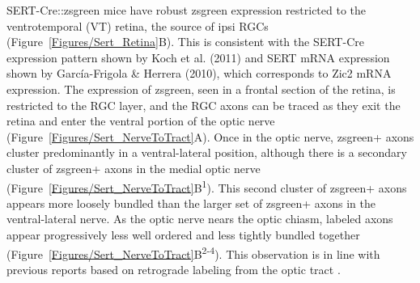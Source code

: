 SERT-Cre::zsgreen mice have robust zsgreen expression restricted to the ventrotemporal (VT) retina, the source of ipsi RGCs (Figure~\ref{Figures/Sert_Retina}B).
This is consistent with the SERT-Cre expression pattern shown by Koch et al. (2011) and SERT mRNA expression shown by Garc\'ia-Frigola \& Herrera (2010), which corresponds to Zic2 mRNA expression. 
The expression of zsgreen, seen in a frontal section of the retina, is restricted to the RGC layer, and the RGC axons can be traced as they exit the retina and enter the ventral portion of the optic nerve (Figure~\ref{Figures/Sert_NerveToTract}A).
Once in the optic nerve, zsgreen+ axons cluster predominantly in a ventral-lateral position, although there is a secondary cluster of zsgreen+ axons in the medial optic nerve (Figure~\ref{Figures/Sert_NerveToTract}B\textsuperscript{1}).
This second cluster of zsgreen+ axons appears more loosely bundled than the larger set of zsgreen+ axons in the ventral-lateral nerve.
As the optic nerve nears the optic chiasm, labeled axons appear progressively less well ordered and less tightly bundled together (Figure~\ref{Figures/Sert_NerveToTract}B\textsuperscript{2-4}).
This observation is in line with previous reports based on retrograde labeling from the optic tract \cite{colello1990early}.

